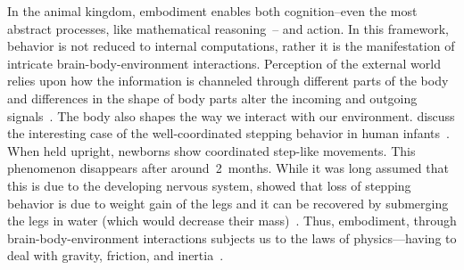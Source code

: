 \par
In the animal kingdom, embodiment enables both cognition--even the most abstract processes, like mathematical reasoning~\cite{Lakoff2000Book}-- and action.
In this framework, behavior is not reduced to internal computations, rather it is the manifestation of intricate brain-body-environment interactions.
Perception of the external world relies upon how the information is channeled through different parts of the body and differences in the shape of body parts alter the incoming and outgoing signals~\cite{Gomez2019Neuron}.
The body also shapes the way we interact with our environment.
 discuss the interesting case of the well-coordinated stepping behavior in human infants~\cite{Gomez2019Neuron}.
When held upright, newborns show coordinated step-like movements.
This phenomenon disappears after around~2~months.
While it was long assumed that this is due to the developing nervous system, \citeauthor{Thelen1984InfBeh} showed that loss of stepping behavior is due to weight gain of the legs and it can be recovered by submerging the legs in water (which would decrease their mass)~\cite{Thelen1984InfBeh}.
Thus, embodiment, through brain-body-environment interactions subjects us to the laws of physics---having to deal with gravity, friction, and inertia~\cite{Pfeifer2006Book}.


